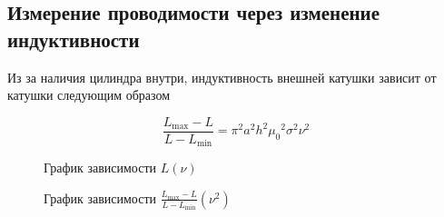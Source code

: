 \documentclass[a4paper]{article}
\begin{document}
\subsection{Измерение проводимости через изменение индуктивности}

Из за наличия цилиндра внутри, индуктивность внешней катушки зависит от катушки
следующим образом

\begin{equation*}
    \frac{L_{\max} - L}{L - L_{\min}} = \pi ^2 a^2 h^2 {\mu_0}^2 \sigma^2 \nu^2
\end{equation*}

\begin{figure}[h]
    \caption{График зависимости $L(\nu)$}\label{fig:L_nu}
    \newpage
\end{figure}

\newpage

\begin{figure}[h]
    \caption{График зависимости $\frac{L_{\max} - L}{L - L_{\min}} (\nu^2)$}\label{fig:L_nu_linearized}
    \newpage
\end{figure}
\end{document}

